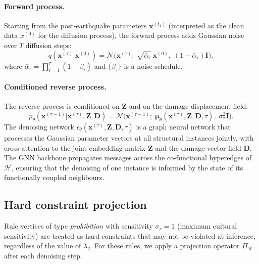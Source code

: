 \documentclass[11pt,a4paper]{article}
\theoremstyle{plain}
\theoremstyle{definition}
\theoremstyle{remark}
\newcommand{\HG}{\mathcal{H}}
\newcommand{\Rul}{\mathcal{R}}
\begin{document}
\paragraph{Forward process.}
Starting from the post-earthquake parameters $\mathbf{x}^{(t_1)}$
(interpreted as the clean data $x^{(0)}$ for the diffusion process),
the forward process adds Gaussian noise over $T$ diffusion steps:
\begin{equation}
  q(\mathbf{x}^{(\tau)} | \mathbf{x}^{(0)})
  = \mathcal{N}\!\bigl(\mathbf{x}^{(\tau)};\;
    \sqrt{\bar{\alpha}_\tau}\,\mathbf{x}^{(0)},\;
    (1 - \bar{\alpha}_\tau)\mathbf{I}\bigr),
  \label{eq:forward}
\end{equation}
where $\bar{\alpha}_\tau = \prod_{i=1}^\tau (1 - \beta_i)$ and
$\{\beta_\tau\}$ is a noise schedule.

\paragraph{Conditioned reverse process.}
The reverse process is conditioned on $\mathbf{Z}$ and on the
damage displacement field:
\begin{equation}
  p_\theta(\mathbf{x}^{(\tau-1)} | \mathbf{x}^{(\tau)}, \mathbf{Z},
           \mathbf{D})
  = \mathcal{N}\!\bigl(\mathbf{x}^{(\tau-1)};\;
    \boldsymbol{\mu}_\theta(\mathbf{x}^{(\tau)}, \mathbf{Z},
                             \mathbf{D}, \tau),\;
    \sigma_\tau^2 \mathbf{I}\bigr).
  \label{eq:reverse}
\end{equation}
The denoising network $\epsilon_\theta(\mathbf{x}^{(\tau)}, \mathbf{Z},
\mathbf{D}, \tau)$ is a graph neural network that processes the
Gaussian parameter vectors at all structural instances jointly, with
cross-attention to the joint embedding matrix $\mathbf{Z}$ and the
damage vector field $\mathbf{D}$. The GNN backbone propagates messages
across the co-functional hyperedges of $\HG$, ensuring that the
denoising of one instance is informed by the state of its functionally
coupled neighbours.

\subsection{Hard constraint projection}
\label{sec:layer4_projection}

Rule vertices of type \textit{prohibition} with sensitivity
$\sigma_r = 1$ (maximum cultural sensitivity) are treated as hard
constraints that may not be violated at inference, regardless of the
value of $\lambda_2$. For these rules, we apply a projection operator
$\Pi_\Rul$ after each denoising step.
\end{document}

